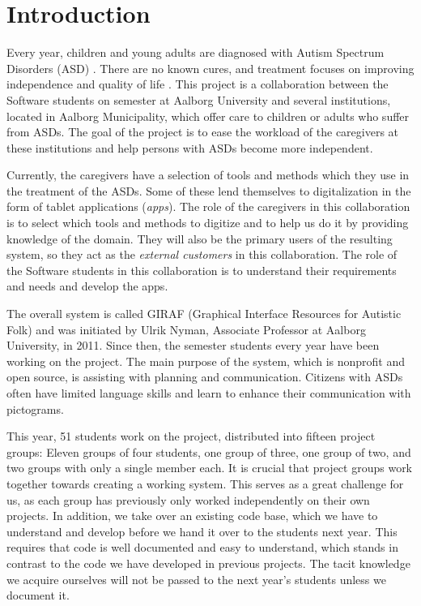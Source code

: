 \chapter{Introduction}
Every year, children and young adults are diagnosed with Autism Spectrum Disorders (ASD) \cite{autism_diagnosis_adults,autism_diagnosis_children}. There are no known cures, and treatment focuses on improving independence and quality of life \cite{Myers01112007}. This project is a collaboration between the Software students on  semester at Aalborg University and several institutions, located in Aalborg Municipality, which offer care to children or adults who suffer from ASDs. The goal of the project is to ease the workload of the caregivers at these institutions and help persons with ASDs become more independent. 

Currently, the caregivers have a selection of tools and methods which they use in the treatment of the ASDs. Some of these lend themselves to digitalization in the form of tablet applications (\emph{apps}). The role of the caregivers in this collaboration is to select which tools and methods to digitize and to help us do it by providing knowledge of the domain. They will also be the primary users of the resulting system, so they act as the \emph{external customers} in this collaboration. The role of the Software students in this collaboration is to understand their requirements and needs and develop the apps.

The overall system is called GIRAF (Graphical Interface Resources for Autistic Folk) and was initiated by Ulrik Nyman, Associate Professor at Aalborg University, in 2011. Since then, the  semester students every year have been working on the project. The main purpose of the system, which is nonprofit and open source, is assisting with planning and communication. Citizens with ASDs often have limited language skills and learn to enhance their communication with pictograms.

This year, 51 students work on the project, distributed into fifteen project groups: Eleven groups of four students, one group of three, one group of two, and two groups with only a single member each. It is crucial that project groups work together towards creating a working system. This serves as a great challenge for us, as each group has previously only worked independently on their own projects. In addition, we take over an existing code base, which we have to understand and develop before we hand it over to the students next year. This requires that code is well documented and easy to understand, which stands in contrast to the code we have developed in previous projects. The tacit knowledge we acquire ourselves will not be passed to the next year's students unless we document it.

